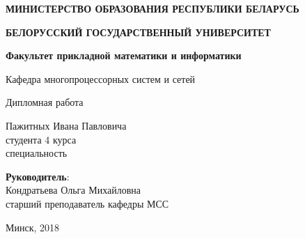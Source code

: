 \begin{titlepage}
    \begin{center}
         \textbf{МИНИСТЕРСТВО ОБРАЗОВАНИЯ РЕСПУБЛИКИ БЕЛАРУСЬ}
    \end{center}
    \begin{center}
         \textbf{БЕЛОРУССКИЙ ГОСУДАРСТВЕННЫЙ УНИВЕРСИТЕТ}
    \end{center}
    \begin{center}
         \textbf{Факультет прикладной математики и информатики}
    \end{center}
    \begin{center}
        Кафедра многопроцессорных систем и сетей
    \end{center}

    \vspace{9em}

    \begin{center}
        \textbf{\@jobtitle}
    \end{center}

    \vspace{2em}

    \begin{center}
        Дипломная работа
    \end{center}

    \vspace{4em}

    \begin{flushright}
        Пажитных Ивана Павловича\\
        студента 4 курса\\
        специальность \\
    \end{flushright}

    \vspace{1em}

    \begin{flushright}
         \textbf{Руководитель}:\\
        Кондратьева Ольга Михайловна\\
        старший преподаватель кафедры МСС\\
    \end{flushright}

    \vfill

    \begin{center}
        Минск, 2018
    \end{center}
\end{titlepage}
\newpage
